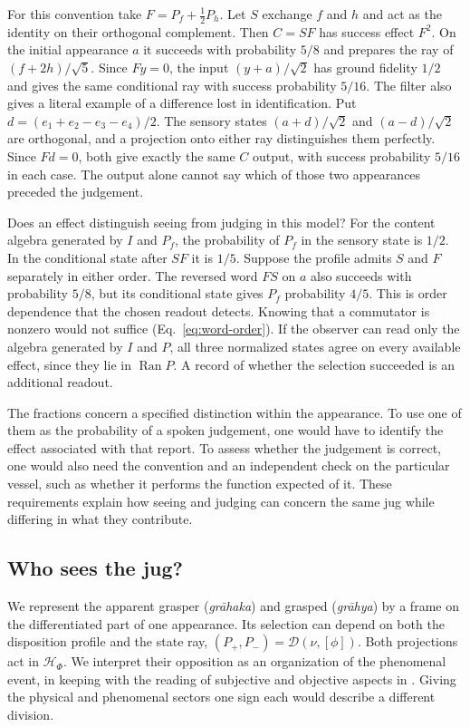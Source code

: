 \documentclass[11pt]{article}
\theoremstyle{definition}
\DeclareMathOperator{\Ran}{Ran}
\begin{document}
For this convention take $F=P_f+\tfrac12P_h$. Let $S$ exchange $f$ and $h$ and act as the identity on their orthogonal complement. Then $C=SF$ has success effect $F^2$. On the initial appearance $a$ it succeeds with probability $5/8$ and prepares the ray of $(f+2h)/\sqrt5$. Since $Fy=0$, the input $(y+a)/\sqrt2$ has ground fidelity $1/2$ and gives the same conditional ray with success probability $5/16$. The filter also gives a literal example of a difference lost in identification. Put $d=(e_1+e_2-e_3-e_4)/2$. The sensory states $(a+d)/\sqrt2$ and $(a-d)/\sqrt2$ are orthogonal, and a projection onto either ray distinguishes them perfectly. Since $Fd=0$, both give exactly the same $C$ output, with success probability $5/16$ in each case. The output alone cannot say which of those two appearances preceded the judgement.

Does an effect distinguish seeing from judging in this model? For the content algebra generated by $I$ and $P_f$, the probability of $P_f$ in the sensory state is $1/2$. In the conditional state after $SF$ it is $1/5$. Suppose the profile admits $S$ and $F$ separately in either order. The reversed word $FS$ on $a$ also succeeds with probability $5/8$, but its conditional state gives $P_f$ probability $4/5$. This is order dependence that the chosen readout detects. Knowing that a commutator is nonzero would not suffice (Eq.~\eqref{eq:word-order}). If the observer can read only the algebra generated by $I$ and $P$, all three normalized states agree on every available effect, since they lie in $\Ran P$. A record of whether the selection succeeded is an additional readout.

The fractions concern a specified distinction within the appearance. To use one of them as the probability of a spoken judgement, one would have to identify the effect associated with that report. To assess whether the judgement is correct, one would also need the convention and an independent check on the particular vessel, such as whether it performs the function expected of it. These requirements explain how seeing and judging can concern the same jug while differing in what they contribute.

\subsection{Who sees the jug?}
\label{subsec:ordinary-frame}

We represent the apparent grasper (\emph{gr\=ahaka}) and grasped (\emph{gr\=ahya}) by a frame on the differentiated part of one appearance. Its selection can depend on both the disposition profile and the state ray, $(P_+,P_-)=\mathcal D(\nu,[\phi])$. Both projections act in $\mathcal H_\Phi$. We interpret their opposition as an organization of the phenomenal event, in keeping with the reading of subjective and objective aspects in \cite[pp.~147--156, 220--228]{Yiannopoulos2020}. Giving the physical and phenomenal sectors one sign each would describe a different division.
\end{document}
